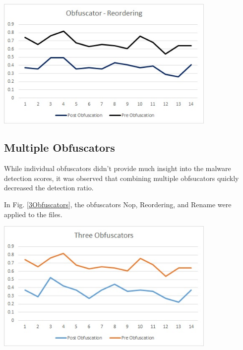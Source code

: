 	 	 \begin{center}
	 	 	\includegraphics[width=0.8\textwidth]{reordering.jpg}
	 	 	\label{reordering}
	 	 \end{center}
	 	 \vspace{3mm}
	 
\subsection{Multiple Obfuscators}

While individual obfuscators didn't provide much insight into the malware detection scores, it was observed that combining multiple obfsucators quickly decreased the detection ratio. 

In Fig. \ref{3Obfuscators}, the obfuscators Nop, Reordering, and Rename were applied to the files.

	 \vspace{3mm}
	 \begin{center}
	 	\includegraphics[width=0.8\textwidth]{3Obfuscators.jpg}
	 	\label{3Obfuscators}
	 \end{center}
	 \vspace{3mm}


